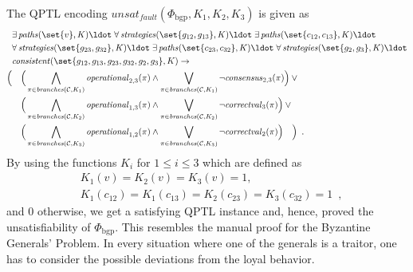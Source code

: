 \documentclass{LMCS}
\newcommand{\branches}{\mathit{branches}}
\newcommand{\paths}{\mathit{paths}}
\newcommand{\strategies}{\mathit{strategies}}
\newcommand{\consistent}{\mathit{consistent}}
\newcommand{\unsatnf}{\mathit{unsat}_\mathit{fault}}
\newcommand{\operational}{\mathit{operational}}
\newcommand{\consensus}{\mathit{consensus}}
\newcommand{\correctval}{\mathit{correctval}}
\theoremstyle{plain}\newtheorem{theorem}[thm]{Theorem}
\theoremstyle{plain}\newtheorem{lemma}[thm]{Lemma}
\theoremstyle{plain}\newtheorem{proposition}[thm]{Proposition}
\theoremstyle{plain}\newtheorem{corollary}[thm]{Corollary}
\theoremstyle{definition}\newtheorem{definition}{Definition}[section]
\begin{document}
The QPTL encoding $\unsatnf(\Phi_\text{bgp}, K_1, K_2, K_3)$ is given as
\begin{align*}
  &\exists\, \paths(\set{v}, K) \ldot\;
   \forall\, \strategies(\set{g_{12},g_{13}}, K) \ldot\;
   \exists\, \paths(\set{c_{12},c_{13}}, K) \ldot \\
  &\forall\, \strategies(\set{g_{23},g_{32}}, K) \ldot\;
   \exists\, \paths(\set{c_{23},c_{32}}, K) \ldot\;
   \forall\, \strategies(\set{g_2,g_3}, K) \ldot \\  
  &\consistent(\set{g_{12},g_{13},g_{23},g_{32},g_2,g_3}, K) \rightarrow \\
    \Big( &\quad \Big( \bigwedge_{\pi \in \branches(\mathcal{C}, K_1)} \operational_{2,3}(\pi) \land \bigvee_{\pi \in \branches(\mathcal{C}, K_1)} \neg\consensus_{2,3}(\pi) \Big) \lor {}\\
    &\quad \Big( \bigwedge_{\pi \in \branches(\mathcal{C}, K_2)} \operational_{1,3}(\pi) \land \bigvee_{\pi \in \branches(\mathcal{C}, K_2)} \neg\correctval_{3}(\pi) \Big) \lor {} \\
    &\quad \Big( \bigwedge_{\pi \in \branches(\mathcal{C}, K_3)} \operational_{1,2}(\pi) \land \bigvee_{\pi \in \branches(\mathcal{C}, K_3)} \neg\correctval_{2}(\pi) \Big) \quad \Big) \enspace .
\end{align*}
By using the functions $K_i$ for $1 \leq i \leq 3$ which are defined as
\begin{align*}
  &K_1(v) = K_2(v) = K_3(v) = 1, \\
  &K_1(c_{12}) = K_1(c_{13}) = K_2(c_{23}) = K_3(c_{32}) = 1 \enspace ,
\end{align*}
and 0 otherwise, we get a satisfying QPTL instance and, hence, proved the unsatisfiability of $\Phi_\text{bgp}$.
This resembles the manual proof for the Byzantine Generals' Problem.
In every situation where one of the generals is a traitor, one has to consider the possible deviations from the loyal behavior.
\end{document}
